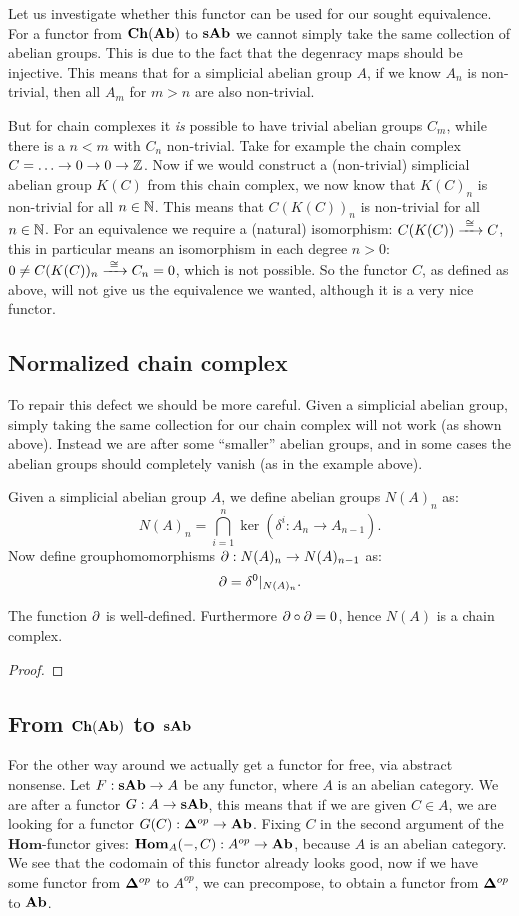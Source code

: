 Let us investigate whether this functor can be used for our sought equivalence. For a functor from $\mathbf{Ch}(\mathbf{Ab})$ to $\mathbf{sAb}$ we cannot simply take the same collection of abelian groups. This is due to the fact that the degenracy maps should be injective. This means that for a simplicial abelian group $A$, if we know $A_n$ is non-trivial, then all $A_m$ for $m > n$ are also non-trivial.

But for chain complexes it \emph{is} possible to have trivial abelian groups $C_m$, while there is a $n < m$ with $C_n$ non-trivial. Take for example the chain complex $ C = \ldots \to 0 \to 0 \to \mathbb{Z} $. Now if we would construct a (non-trivial) simplicial abelian group $K(C)$ from this chain complex, we now know that $K(C)_n$ is non-trivial for all $n \in \mathbb{N}$. This means that $C(K(C))_n$ is non-trivial for all $n \in \mathbb{N}$. For an equivalence we require a (natural) isomorphism: $C(K(C)) \xrightarrow{\,\,{\cong}\,\,} C$, this in particular means an isomorphism in each degree $n > 0$: $ 0 \neq C(K(C))_n \xrightarrow{\,\,{\cong}\,\,} C_n = 0 $, which is not possible. So the functor $C$, as defined as above, will not give us the equivalence we wanted, although it is a very nice functor.

\subsection{Normalized chain complex}
To repair this defect we should be more careful. Given a simplicial abelian group, simply taking the same collection for our chain complex will not work (as shown above). Instead we are after some ``smaller'' abelian groups, and in some cases the abelian groups should completely vanish (as in the example above).

Given a simplicial abelian group $A$, we define abelian groups $N(A)_n$ as:
$$ N(A)_n = \bigcap_{i=1}^{n} \ker(\delta^i : A_n \to A_{n-1}). $$
Now define grouphomomorphisms $\partial : N(A)_n \to N(A)_{n-1}$ as:
$$ \partial = \delta^0|_{N(A)_n}. $$
\begin{lemma}
	The function $ \partial $ is well-defined. Furthermore $ \partial \circ \partial = 0 $, hence $N(A)$ is a chain complex.
\end{lemma}
\begin{proof}
\end{proof}



\subsection{From $\mathbf{Ch}(\mathbf{Ab})$ to $\mathbf{sAb}$}
For the other way around we actually get a functor for free, via abstract nonsense. Let $F : \mathbf{sAb} \to A$ be any functor, where $A$ is an abelian category. We are after a functor $G : A \to \mathbf{sAb}$, this means that if we are given $C \in A$, we are looking for a functor $G(C) : \mathbf{\Delta}^{op} \to \mathbf{Ab}$. Fixing $C$ in the second argument of the $\mathbf{Hom}$-functor gives: $\mathbf{Hom}_{A}(-, C) : A^{op} \to \mathbf{Ab}$, because $A$ is an abelian category. We see that the codomain of this functor already looks good, now if we have some functor from $\mathbf{\Delta}^{op}$ to $A^{op}$, we can precompose, to obtain a functor from $\mathbf{\Delta}^{op}$ to $\mathbf{Ab}$.


